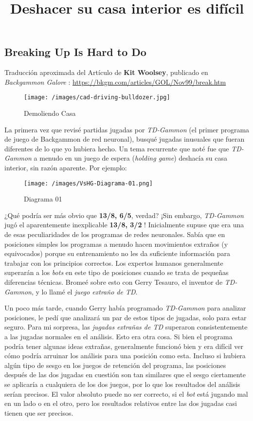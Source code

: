 \documentclass[
]{article}
\title{Deshacer su casa interior es difícil}
\author{}
\date{}
\begin{document}
\maketitle

\subsection{Breaking Up Is Hard to Do}

Traducción aproximada del Artículo de \textbf{Kit Woolsey}, publicado en
\emph{Backgammon Galore} :
\url{https://bkgm.com/articles/GOL/Nov99/break.htm}

\begin{figure}
\centering
\texttt{[image: /images/cad-driving-bulldozer.jpg]}
\caption{Demoliendo Casa}
\end{figure}

La primera vez que revisé partidas jugadas por \emph{TD-Gammon} (el
primer programa de juego de Backgammon de red neuronal), busqué jugadas
inusuales que fueran diferentes de lo que yo hubiera hecho. Un tema
recurrente que noté fue que \emph{TD-Gammon} a menudo en un juego de
espera (\emph{holding game}) deshacía su casa interior, sin razón
aparente. Por ejemplo:

\begin{figure}
\centering
\texttt{[image: /images/VsHG-Diagrama-01.png]}
\caption{Diagrama 01}
\end{figure}

¿Qué podría ser más obvio que \textbf{13/8, 6/5}, verdad? ¡Sin embargo,
\emph{TD-Gammon} jugó el aparentemente inexplicable \textbf{13/8, 3/2} !
Inicialmente supuse que era una de esas peculiaridades de los programas
de redes neuronales. Sabía que en posiciones simples los programas a
menudo hacen movimientos extraños (y equivocados) porque su
entrenamiento no les da suficiente información para trabajar con los
principios correctos. Los expertos humanos generalmente superarán a los
\emph{bots} en este tipo de posiciones cuando se trata de pequeñas
diferencias técnicas. Bromeé sobre esto con Gerry Tesauro, el inventor
de \emph{TD-Gammon}, y lo llamé el \emph{juego extraño de TD}.

Un poco más tarde, cuando Gerry había programado \emph{TD-Gammon} para
analizar posiciones, le pedí que analizará un par de estos tipos de
jugadas, solo para estar seguro. Para mi sorpresa, las \emph{jugadas
extrañas de TD} superaron consistentemente a las jugadas normales en el
análisis. Esto era otra cosa. Si bien el programa podría tener algunas
ideas extrañas, generalmente funcionó bien y era difícil ver cómo podría
arruinar los análisis para una posición como esta. Incluso si hubiera
algún tipo de sesgo en los juegos de retención del programa, las
posiciones después de las dos jugadas en cuestión son tan similares que
el sesgo ciertamente se aplicaría a cualquiera de los dos juegos, por lo
que los resultados del análisis serían precisos. El valor absoluto puede
no ser correcto, si el \emph{bot} está jugando mal en un lado o en el
otro, pero los resultados relativos entre las dos jugadas casi tienen
que ser precisos.
\end{document}
